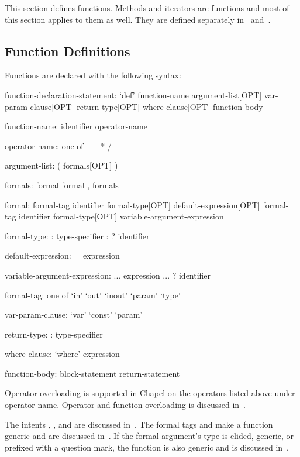 \label{Functions}

This section defines functions.  Methods and iterators are functions
and most of this section applies to them as well.  They are defined
separately in~ and~.

\subsection{Function Definitions}
\label{Function_Definitions}

Functions are declared with the following syntax:
\begin{syntax}
function-declaration-statement:
  `def' function-name argument-list[OPT] var-param-clause[OPT]
    return-type[OPT] where-clause[OPT] function-body

function-name:
  identifier
  operator-name

operator-name: one of
  + - * / %

argument-list:
  ( formals[OPT] )

formals:
  formal
  formal , formals

formal:
  formal-tag identifier formal-type[OPT] default-expression[OPT]
  formal-tag identifier formal-type[OPT] variable-argument-expression

formal-type:
  : type-specifier
  : ? identifier

default-expression:
  = expression

variable-argument-expression:
  ... expression
  ... ? identifier

formal-tag: one of
  `in' `out' `inout' `param' `type'

var-param-clause:
  `var'
  `const'
  `param'

return-type:
  : type-specifier

where-clause:
  `where' expression

function-body:
  block-statement
  return-statement
\end{syntax}

Operator overloading is supported in Chapel on the operators listed
above under operator name.  Operator and function overloading is
discussed in~.

The intents , , and  are discussed
in~.  The formal tags  and  make
a function generic and are discussed in~.  If the
formal argument's type is elided, generic, or prefixed with a question
mark, the function is also generic and is discussed
in~.

